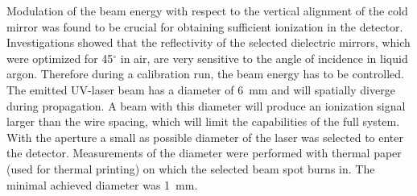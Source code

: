 Modulation of the beam energy with respect to the vertical alignment of the cold mirror was found to be crucial for obtaining sufficient ionization in the detector. Investigations showed that the reflectivity of the selected dielectric mirrors, which were optimized for 45$^{\circ}$ in air, are very sensitive to the angle of incidence in liquid argon. Therefore during a calibration run, the beam energy has to be controlled. The emitted UV-laser beam has a diameter of 6~mm and will spatially diverge during propagation.  A beam with this diameter will produce an ionization signal larger than the wire spacing, which will limit the capabilities of the full system. With the aperture a small as possible diameter of the laser was selected to enter the detector. Measurements of the diameter were performed with thermal paper (used for thermal printing) on which the selected beam spot burns in. The minimal achieved diameter was 1~mm.


